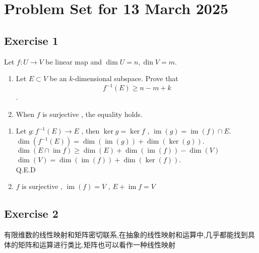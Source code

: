 \documentclass[11pt]{ctexart}
\theoremstyle{definition}
\numberwithin{equation}{section}
\newcommand{\op}[1]{\operatorname{#1}}%
\theoremstyle{definition}
\theoremstyle{remark}
\begin{document}
\section{Problem Set for 13 March 2025}
\subsection{Exercise 1}
Let $f: U \to V$ be linear map and $\op{dim}U=n,\op{din}V=m$.
\begin{enumerate}
    \item Let $E \subset V$ be an $k$-dimensional subspace. Prove that $$f^{-1}(E)\geq n-m+k$$.
    \item When $f$ is surjective , the equality holds.
\end{enumerate} 
\begin{aaa}
    \begin{enumerate}
        \item Let $g:f^{-1}(E)\to E$ , then $\ker g=\ker f$ , $\op{im}(g) = \op{im}(f)\cap E$.\\$\dim(f^{-1}(E))=\dim(\op{im}(g))+\dim(\ker(g))$.\\$\dim(E\cap \op{im}f)\geq \dim(E)+\dim(\op{im}(f))-\dim(V)$\\$\dim(V)=\dim(\op{im}(f))+\dim(\ker(f))$.\\Q.E.D
        \item $f$ is surjective , $\op{im}(f)=V$ , $E+\op{im}f=V$
    \end{enumerate}
\end{aaa}
\subsection{Exercise 2}
\begin{aaa}
    有限维数的线性映射和矩阵密切联系,在抽象的线性映射和运算中,几乎都能找到具体的矩阵和运算进行类比.矩阵也可以看作一种线性映射
\end{aaa}
\end{document}
